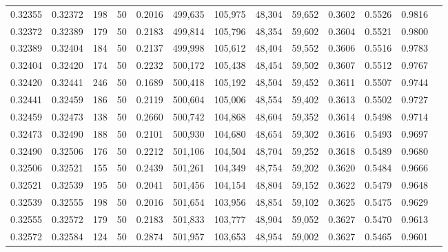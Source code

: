 \begin{tabular}{rrrrrrrrrrrrr}
0.32355 & 0.32372 &   198 &  50 &                                     0.2016 & 499,635 & 105,975 &  48,304 &  59,652 & 0.3602 & 0.5526 & 0.9816 \\
0.32372 & 0.32389 &   179 &  50 &                                     0.2183 & 499,814 & 105,796 &  48,354 &  59,602 & 0.3604 & 0.5521 & 0.9800 \\
0.32389 & 0.32404 &   184 &  50 &                                     0.2137 & 499,998 & 105,612 &  48,404 &  59,552 & 0.3606 & 0.5516 & 0.9783 \\
0.32404 & 0.32420 &   174 &  50 &                                     0.2232 & 500,172 & 105,438 &  48,454 &  59,502 & 0.3607 & 0.5512 & 0.9767 \\
0.32420 & 0.32441 &   246 &  50 &                                     0.1689 & 500,418 & 105,192 &  48,504 &  59,452 & 0.3611 & 0.5507 & 0.9744 \\
0.32441 & 0.32459 &   186 &  50 &                                     0.2119 & 500,604 & 105,006 &  48,554 &  59,402 & 0.3613 & 0.5502 & 0.9727 \\
0.32459 & 0.32473 &   138 &  50 &                                     0.2660 & 500,742 & 104,868 &  48,604 &  59,352 & 0.3614 & 0.5498 & 0.9714 \\
0.32473 & 0.32490 &   188 &  50 &                                     0.2101 & 500,930 & 104,680 &  48,654 &  59,302 & 0.3616 & 0.5493 & 0.9697 \\
0.32490 & 0.32506 &   176 &  50 &                                     0.2212 & 501,106 & 104,504 &  48,704 &  59,252 & 0.3618 & 0.5489 & 0.9680 \\
0.32506 & 0.32521 &   155 &  50 &                                     0.2439 & 501,261 & 104,349 &  48,754 &  59,202 & 0.3620 & 0.5484 & 0.9666 \\
0.32521 & 0.32539 &   195 &  50 &                                     0.2041 & 501,456 & 104,154 &  48,804 &  59,152 & 0.3622 & 0.5479 & 0.9648 \\
0.32539 & 0.32555 &   198 &  50 &                                     0.2016 & 501,654 & 103,956 &  48,854 &  59,102 & 0.3625 & 0.5475 & 0.9629 \\
0.32555 & 0.32572 &   179 &  50 &                                     0.2183 & 501,833 & 103,777 &  48,904 &  59,052 & 0.3627 & 0.5470 & 0.9613 \\
0.32572 & 0.32584 &   124 &  50 &                                     0.2874 & 501,957 & 103,653 &  48,954 &  59,002 & 0.3627 & 0.5465 & 0.9601 \\

\end{tabular}
